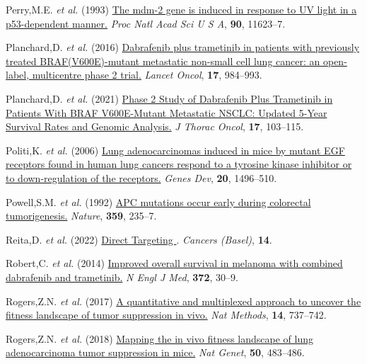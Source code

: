 \begin{CSLReferences}{1}{0}
\leavevmode{}%
Perry,M.E. \emph{et al.} (1993) \href{https://doi.org/10.1073/pnas.90.24.11623}{The mdm-2 gene is induced in response to UV light in a p53-dependent manner.} \emph{Proc Natl Acad Sci U S A}, \textbf{90}, 11623--7.

\leavevmode{}%
Planchard,D. \emph{et al.} (2016) \href{https://doi.org/10.1016/s1470-2045(16)30146-2}{Dabrafenib plus trametinib in patients with previously treated BRAF(V600E)-mutant metastatic non-small cell lung cancer: an open-label, multicentre phase 2 trial.} \emph{Lancet Oncol}, \textbf{17}, 984--993.

\leavevmode{}%
Planchard,D. \emph{et al.} (2021) \href{https://doi.org/10.1016/j.jtho.2021.08.011}{Phase 2 Study of Dabrafenib Plus Trametinib in Patients With BRAF V600E-Mutant Metastatic NSCLC: Updated 5-Year Survival Rates and Genomic Analysis.} \emph{J Thorac Oncol}, \textbf{17}, 103--115.

\leavevmode{}%
Politi,K. \emph{et al.} (2006) \href{https://doi.org/10.1101/gad.1417406}{Lung adenocarcinomas induced in mice by mutant EGF receptors found in human lung cancers respond to a tyrosine kinase inhibitor or to down-regulation of the receptors.} \emph{Genes Dev}, \textbf{20}, 1496--510.

\leavevmode{}%
Powell,S.M. \emph{et al.} (1992) \href{https://doi.org/10.1038/359235a0}{APC mutations occur early during colorectal tumorigenesis.} \emph{Nature}, \textbf{359}, 235--7.

\leavevmode{}%
Reita,D. \emph{et al.} (2022) \href{https://doi.org/10.3390/cancers14051321}{Direct Targeting }. \emph{Cancers (Basel)}, \textbf{14}.

\leavevmode{}%
Robert,C. \emph{et al.} (2014) \href{https://doi.org/10.1056/nejmoa1412690}{Improved overall survival in melanoma with combined dabrafenib and trametinib.} \emph{N Engl J Med}, \textbf{372}, 30--9.

\leavevmode{}%
Rogers,Z.N. \emph{et al.} (2017) \href{https://doi.org/10.1038/nmeth.4297}{A quantitative and multiplexed approach to uncover the fitness landscape of tumor suppression in vivo.} \emph{Nat Methods}, \textbf{14}, 737--742.

\leavevmode{}%
Rogers,Z.N. \emph{et al.} (2018) \href{https://doi.org/10.1038/s41588-018-0083-2}{Mapping the in vivo fitness landscape of lung adenocarcinoma tumor suppression in mice.} \emph{Nat Genet}, \textbf{50}, 483--486.


\end{CSLReferences}
